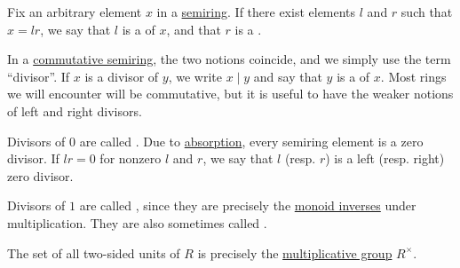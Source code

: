 \begin{definition}\label{def:divisibility}\mimprovised
  Fix an arbitrary element \( x \) in a \hyperref[def:semiring]{semiring}. If there exist elements \( l \) and \( r \) such that \( x = lr \), we say that \( l \) is a  of \( x \), and that \( r \) is a .

  In a \hyperref[def:semiring/commutative]{commutative semiring}, the two notions coincide, and we simply use the term \enquote{divisor}. If \( x \) is a divisor of \( y \), we write \( x \mid y \) and say that \( y \) is a  of \( x \). Most rings we will encounter will be commutative, but it is useful to have the weaker notions of left and right divisors.

  \begin{thmenum}
     Divisors of \( 0 \) are called . Due to \hyperref[def:semiring/absorption]{absorption}, every semiring element is a zero divisor. If \( lr = 0 \) for nonzero \( l \) and \( r \), we say that \( l \) (resp. \( r \)) is a  left (resp. right) zero divisor.

     Divisors of \( 1 \) are called , since they are precisely the \hyperref[def:monoid_inverse]{monoid inverses} under multiplication. They are also sometimes called .

    The set of all two-sided units of \( R \) is precisely the \hyperref[def:semiring]{multiplicative group} \( R^\times \).
  \end{thmenum}
\end{definition}

